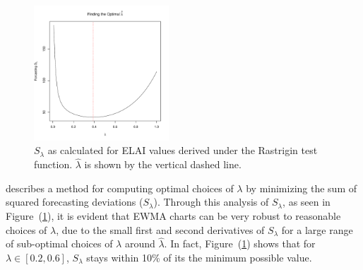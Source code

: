 \documentclass{article}
\newcommand{\argmin}{\operatornamewithlimits{argmin}}
\begin{document}
%
%
\begin{figure}
\vspace{-0.2cm}
\includegraphics[width=0.45\textwidth]{./figures/ssRastHardOpt.pdf}
\caption{ 
$S_\lambda$ as calculated for ELAI values derived under the 
Rastrigin test function. $\hat\lambda$ is shown by the vertical dashed line. 
} 
\label{bestL} 
\end{figure}
%
%
\hspace*{1cm}\hspace*{-1.1cm}
%
\cite{boxBook} describes a method for computing optimal choices of $\lambda$ 
by minimizing the sum of squared forecasting deviations ($S_\lambda$).
Through this analysis of $S_\lambda$, as seen in Figure~(\ref{bestL}), it is 
evident that EWMA charts can be very robust to reasonable choices of 
$\lambda$, due to the small first and second derivatives of $S_\lambda$ for a 
large range of sub-optimal choices of $\lambda$ around $\hat\lambda$. In fact, 
Figure~(\ref{bestL}) shows that for \mbox{$\lambda\in[0.2, 0.6]$,} $S_\lambda$ 
stays within 10\% of its the minimum possible value. 

%
\end{document}
